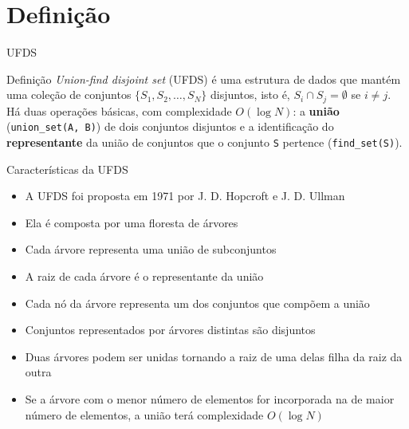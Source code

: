 \section{Definição}

\begin{frame}[fragile]{UFDS}

    \begin{block}{Definição}
        \textit{Union-find disjoint set} (UFDS) é uma estrutura de dados que mantém uma coleção
        de conjuntos $\lbrace S_1, S_2, \ldots, S_N\rbrace$ disjuntos, isto é, $S_i\cap S_j =
        \emptyset$ se $i\neq j$. Há duas operações básicas, com complexidade $O(\log N)$: a 
        \textbf{união} (\texttt{union\_set(A, B)}) de dois conjuntos disjuntos e a identificação 
        do \textbf{representante} da união de conjuntos que o conjunto \texttt{S} pertence 
        (\texttt{find\_set(S)}).
    \end{block}

\end{frame}

\begin{frame}[fragile]{Características da UFDS}

    \begin{itemize}
        \item A UFDS foi proposta em 1971 por J. D. Hopcroft e J. D. Ullman

        \item Ela é composta por uma floresta de árvores

        \item Cada árvore representa uma união de subconjuntos

        \item A raiz de cada árvore é o representante da união

        \item Cada nó da árvore representa um dos conjuntos que compõem a união

        \item Conjuntos representados por árvores distintas são disjuntos

        \item Duas árvores podem ser unidas tornando a raiz de uma delas filha da raiz da outra

        \item Se a árvore com o menor número de elementos for incorporada na de maior número de
            elementos, a união terá complexidade $O(\log N)$
    \end{itemize}

\end{frame}

